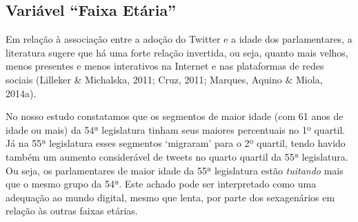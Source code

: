 \subsection{Variável ``Faixa Etária''}

Em relação à associação entre a adoção do Twitter e a idade dos
parlamentares, a literatura sugere que há uma forte relação invertida,
ou seja, quanto mais velhos, menos presentes e menos interativos na
Internet e nas plataformas de redes sociais (Lilleker \& Michalska,
2011; Cruz, 2011; Marques, Aquino \& Miola, 2014a).

No nosso estudo constatamos que os segmentos de maior idade (com 61 anos
de idade ou mais) da 54ª legislatura tinham seus maiores percentuais no
1º quartil. Já na 55ª legislatura esses segmentos `migraram' para o 2º
quartil, tendo havido também um aumento considerável de tweets no quarto
quartil da 55ª legislatura. Ou seja, os parlamentares de maior idade da
55ª legislatura estão \emph{tuitando} mais que o mesmo grupo da 54ª.
Este achado pode ser interpretado como uma adequação ao mundo digital,
mesmo que lenta, por parte dos sexagenários em relação às outras faixas
etárias.

